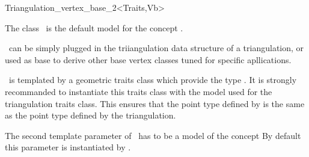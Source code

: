 

\begin{ccRefClass}{Triangulation_vertex_base_2<Traits,Vb>}  


\ccDefinition
  
The class \ccRefName\ is the default model for the concept
.

 \ccRefName\ can be simply plugged in the triiangulation data
structure
of a triangulation, or used  as base to derive
other base vertex classes tuned for specific apllications.


\ccParameters
\ccRefName\  is  templated by a geometric traits class which provide the type
. It is strongly recommanded to instantiate this
traits class with the model used for the triangulation traits class.
This ensures that the point type defined by \ccRefName
is the same as the point type defined by 
the triangulation.

The second template parameter of \ccRefName\ 
has to be a model of the concept 
By default this parameter is
 instantiated by .

\ccIsModel
{}

\ccInheritsFrom
{}

\ccSeeAlso
{} \\
 \\
 \\

\end{ccRefClass}


